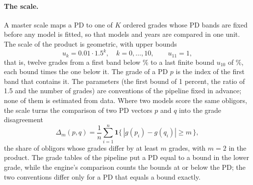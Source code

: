 \paragraph{The scale.} A master scale maps a PD to one of $K$ ordered grades whose PD bands are fixed before any model is fitted, so that models and years are compared in one unit. The scale of the product is geometric, with upper bounds
\begin{equation}
u_k = 0.01\cdot 1.5^{k},\quad k = 0,\dots,10,\qquad u_{11} = 1,
\label{eq:ratings-scale}
\end{equation}
that is, twelve grades from a first band below \rtgMsFirst{}\% to a last finite bound $u_{10}$ of \rtgMsTenth{}\%, each bound \rtgMsRatio{} times the one below it. The grade of a PD $p$ is the index of the first band that contains it. The parameters (the first bound of 1 percent, the ratio of 1.5 and the number of grades) are conventions of the pipeline fixed in advance; none of them is estimated from data. Where two models score the same obligors, the scale turns the comparison of two PD vectors $p$ and $q$ into the grade disagreement
\begin{equation}
\Delta_m(p,q) = \frac{1}{n}\sum_{i=1}^{n}\mathbf{1}\bigl\{\,|g(p_i)-g(q_i)|\ge m\,\bigr\},
\label{eq:ratings-disagreement}
\end{equation}
the share of obligors whose grades differ by at least $m$ grades, with $m = 2$ in the product. The grade tables of the pipeline put a PD equal to a bound in the lower grade, while the engine's comparison counts the bounds at or below the PD; the two conventions differ only for a PD that equals a bound exactly.

